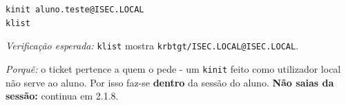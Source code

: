 
\begin{lstlisting}[style=bashstyle]
kinit aluno.teste@ISEC.LOCAL
klist
\end{lstlisting}

\emph{Verificação esperada:} \texttt{klist} mostra \texttt{krbtgt/\allowbreak{}ISEC.LOCAL@ISEC.LOCAL}.

\emph{Porquê:} o ticket pertence a quem o pede - um \texttt{kinit} feito como utilizador local não serve ao aluno. Por isso faz-se \textbf{dentro} da sessão do aluno. \textbf{Não saias da sessão:} continua em 2.1.8.

